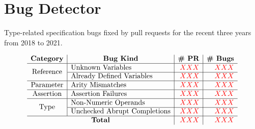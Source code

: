 \section{Bug Detector}\label{sec:checker}

\begin{table}
  \centering
  \caption{Type-related specification bugs fixed by pull requests for the recent
  three years from 2018 to 2021.}
  \label{table:pr-bugs}
  \vspace*{-1.5em}
  \[
    \small
    \begin{array}{c|l|r|r}
      \multicolumn{1}{c|}{\textbf{Category}} &
      \multicolumn{1}{c|}{\textbf{Bug Kind}} &
      \multicolumn{1}{c|}{\textbf{\# PR}} &
      \multicolumn{1}{c}{\textbf{\# Bugs}}\\
      \hline

      \multirow{2}{*}{\text{Reference}}
      & \text{Unknown Variables} & \inred{XXX} & \inred{XXX}\\\cline{2-4}
      & \text{Already Defined Variables} & \inred{XXX} & \inred{XXX}\\\hline

      \multirow{1}{*}{\text{Parameter}}
      & \text{Arity Mismatches} & \inred{XXX} & \inred{XXX}\\\hline

      \multirow{1}{*}{\text{Assertion}}
      & \text{Assertion Failures} & \inred{XXX} & \inred{XXX}\\\hline

      \multirow{2}{*}{\text{Type}}
      & \text{Non-Numeric Operands} & \inred{XXX} & \inred{XXX}\\\cline{2-4}
      & \text{Unchecked Abrupt Completions} & \inred{XXX} & \inred{XXX}\\\hline

      \multicolumn{2}{c|}{\textbf{Total}} & \inred{XXX} & \inred{XXX}\\

    \end{array}
  \]
  \vspace*{-1.5em}
\end{table}


